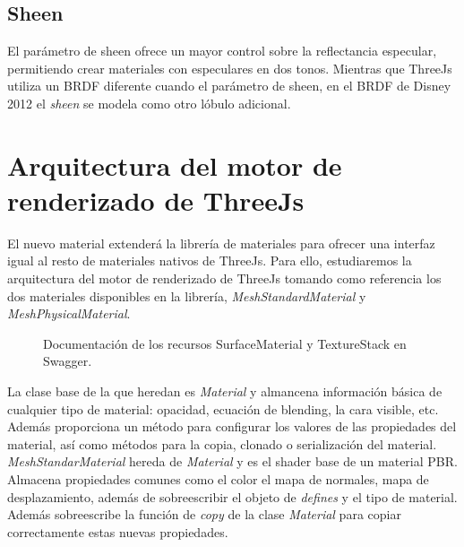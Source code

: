     \subsection{Sheen}
    El par\'ametro de sheen ofrece un mayor control sobre la reflectancia especular, permitiendo crear materiales con
    especulares en dos tonos. Mientras que ThreeJs utiliza un BRDF diferente cuando el par\'ametro de sheen, en el
    BRDF de Disney 2012 el \textit{sheen} se modela como otro l\'obulo adicional.\\

  \section{Arquitectura del motor de renderizado de ThreeJs}
  El nuevo material extender\'a la librer\'ia de materiales para ofrecer una interfaz igual al resto de materiales nativos
  de ThreeJs. Para ello, estudiaremos la arquitectura del motor de renderizado de ThreeJs tomando como referencia los dos
  materiales disponibles en la librer\'ia, \textit{MeshStandardMaterial} y \textit{MeshPhysicalMaterial}.

  \begin{figure}[H]
    \centering
    \caption{Documentaci\'on de los recursos SurfaceMaterial y TextureStack en Swagger.}
    \vspace{0.5cm}
  \end{figure}

  La clase base de la que heredan es \textit{Material} y almancena informaci\'on b\'asica de
  cualquier tipo de material: opacidad, ecuaci\'on de blending, la cara visible, etc. Adem\'as proporciona un m\'etodo
  para configurar los valores de las propiedades del material, as\'i como m\'etodos para la copia, clonado o serializaci\'on
  del material.\\

  \textit{MeshStandarMaterial} hereda de \textit{Material} y es el shader base de un material PBR. Almacena propiedades comunes
  como el color el mapa de normales, mapa de desplazamiento, adem\'as de sobreescribir el objeto de \textit{defines} y el tipo
  de material. Adem\'as sobreescribe la funci\'on de \textit{copy} de la clase \textit{Material} para copiar correctamente
  estas nuevas propiedades.\\

